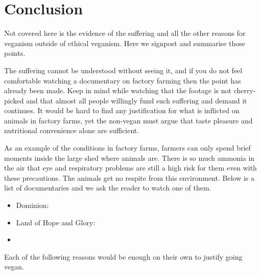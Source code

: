 
\section{Conclusion}

Not covered here is the evidence of the suffering and all the other reasons for veganism outside of ethical veganism. Here we signpost and summarise those points.

The suffering cannot be understood without seeing it, and if you do not feel comfortable watching a documentary on factory farming then the point has already been made. Keep in mind while watching that the footage is not cherry-picked and that almost all people willingly fund such suffering and demand it continues. It would be hard to find any justification for what is inflicted on animals in factory farms, yet the non-vegan must argue that taste pleasure and nutritional convenience alone are sufficient.

As an example of the conditions in factory farms, farmers can only spend brief moments inside the large shed where animals are. There is so much ammonia in the air that eye and respiratory problems are still a high risk for them even with these precautions. The animals get no respite from this environment. Below is a list of documentaries and we ask the reader to watch one of them.

\begin{itemize}
	\item Dominion: \url{}
	\item Land of Hope and Glory: \url{}
	\item 
\end{itemize}

Each of the following reasons would be enough on their own to justify going vegan.

